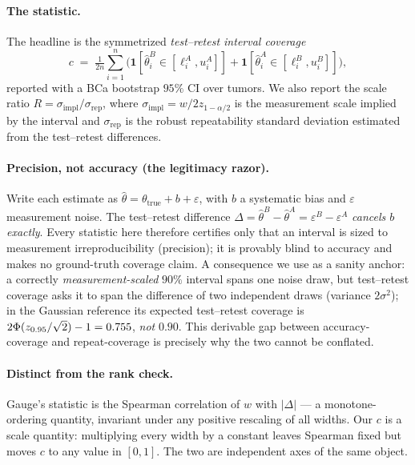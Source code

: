 \documentclass[11pt]{article}
\newcommand{\sigimp}{\sigma_{\mathrm{impl}}}
\newcommand{\sigrep}{\sigma_{\mathrm{rep}}}
\begin{document}
\paragraph{The statistic.} The headline is the symmetrized \emph{test--retest interval
coverage}
\[
c \;=\; \tfrac{1}{2n}\sum_{i=1}^{n}\Big(\mathbf{1}[\hat\theta^{B}_i\in[\ell^{A}_i,u^{A}_i]]
   + \mathbf{1}[\hat\theta^{A}_i\in[\ell^{B}_i,u^{B}_i]]\Big),
\]
reported with a BCa bootstrap $95\%$ CI over tumors. We also report the scale ratio
$R=\sigimp/\sigrep$, where $\sigimp=w/2z_{1-\alpha/2}$ is the measurement scale implied by
the interval and $\sigrep$ is the robust repeatability standard deviation estimated from the
test--retest differences.

\paragraph{Precision, not accuracy (the legitimacy razor).} Write each estimate as
$\hat\theta = \theta_{\mathrm{true}} + b + \varepsilon$, with $b$ a systematic bias and
$\varepsilon$ measurement noise. The test--retest difference
$\Delta = \hat\theta^{B}-\hat\theta^{A} = \varepsilon^{B}-\varepsilon^{A}$ \emph{cancels
$b$ exactly}. Every statistic here therefore certifies only that an interval is sized to
measurement irreproducibility (precision); it is provably blind to accuracy and makes no
ground-truth coverage claim. A consequence we use as a sanity anchor: a correctly
\emph{measurement-scaled} $90\%$ interval spans one noise draw, but test--retest coverage
asks it to span the difference of two independent draws (variance $2\sigma^2$); in the
Gaussian reference its expected test--retest coverage is
$2\Phi(z_{0.95}/\sqrt2)-1 = 0.755$, \emph{not} $0.90$. This derivable gap between
accuracy-coverage and repeat-coverage is precisely why the two cannot be conflated.

\paragraph{Distinct from the rank check.} Gauge's statistic is the Spearman correlation of
$w$ with $|\Delta|$ --- a monotone-ordering quantity, invariant under any positive rescaling
of all widths. Our $c$ is a scale quantity: multiplying every width by a constant leaves
Spearman fixed but moves $c$ to any value in $[0,1]$. The two are independent axes of the
same object.
\end{document}

